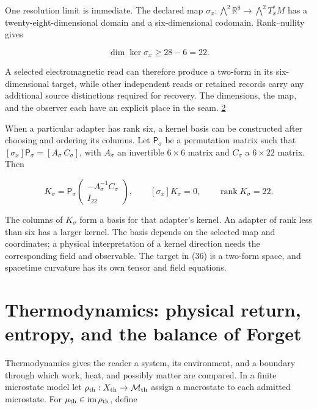 One resolution limit is immediate. The declared map \(\sigma_x:\bigwedge^2\mathbb R^8\to\bigwedge^2T_x^*M\) has a twenty-eight-dimensional domain and a six-dimensional codomain. Rank--nullity gives

\[
\dim\ker\sigma_x\geq28-6=22.
\tag{36}
\]

A selected electromagnetic read can therefore produce a two-form in its six-dimensional target, while other independent reads or retained records carry any additional source distinctions required for recovery. The dimensions, the map, and the observer each have an explicit place in the seam. \href{https://doi.org/10.5281/zenodo.23697265}{2}

When a particular adapter has rank six, a kernel basis can be constructed after choosing and ordering its columns. Let \(\mathsf P_\sigma\) be a permutation matrix such that \([\sigma_x]\mathsf P_\sigma=[A_\sigma\ C_\sigma]\), with \(A_\sigma\) an invertible \(6\times6\) matrix and \(C_\sigma\) a \(6\times22\) matrix. Then

\[
K_\sigma
=\mathsf P_\sigma
\begin{pmatrix}-A_\sigma^{-1}C_\sigma\\I_{22}\end{pmatrix},
\qquad
[\sigma_x]K_\sigma=0,\qquad
\operatorname{rank}K_\sigma=22.
\tag{36a}
\]

The columns of \(K_\sigma\) form a basis for that adapter's kernel. An adapter of rank less than six has a larger kernel. The basis depends on the selected map and coordinates; a physical interpretation of a kernel direction needs the corresponding field and observable. The target in (36) is a two-form space, and spacetime curvature has its own tensor and field equations.

\hypertarget{thermodynamics-physical-return-entropy-and-the-balance-of-forget}{%
\section{Thermodynamics: physical return, entropy, and the balance of Forget}\label{thermodynamics-physical-return-entropy-and-the-balance-of-forget}}

Thermodynamics gives the reader a system, its environment, and a boundary through which work, heat, and possibly matter are compared. In a finite microstate model let \(\rho_{\rm th}:X_{\rm th}\to\mathcal M_{\rm th}\) assign a macrostate to each admitted microstate. For \(\mu_{\rm th}\in\operatorname{im}\rho_{\rm th}\), define

